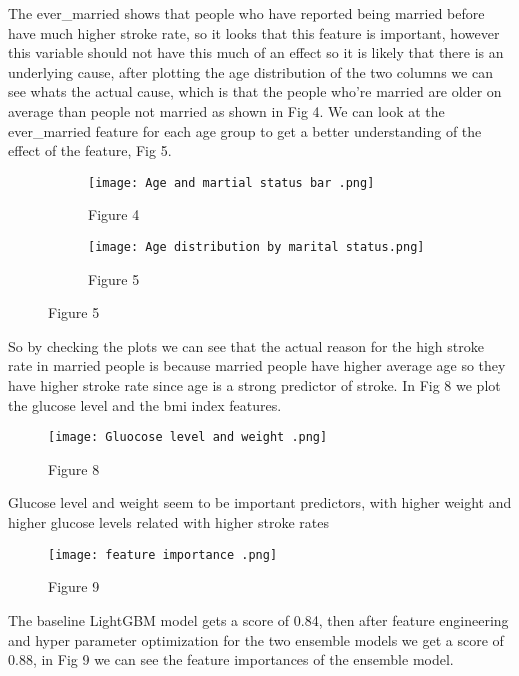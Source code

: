 \documentclass{article}
\begin{document}
 The ever\_married shows that people who have reported being married before have much higher stroke rate, so it looks that this feature is important, however this variable should not have this much of an effect so it is likely that there is an underlying cause, after plotting the age distribution of the two columns we can see whats the actual cause, which is that the people who're married are older on average than people not married as shown in Fig 4. We can look at the ever\_married feature for each age group to get a better understanding of the effect of the feature, Fig 5.

\begin{figure}[h]
     \centering
     \begin{subfigure}[b]{0.45\textwidth}
         \centering
         \texttt{[image: Age and martial status bar .png]}
            \captionsetup{labelformat=empty}
         \caption{Figure 4}
        
  
     \end{subfigure}
     \hfill
     \begin{subfigure}[hb]{0.4\textwidth}
         \centering
         \texttt{[image: Age distribution by marital status.png]}
            \captionsetup{labelformat=empty}
         \caption{Figure 5}
        
    
     \end{subfigure}
     \hfill

\end{figure}

So by checking the plots we can see that the actual reason for the high stroke rate in married people is because married people have higher average age so they have higher stroke rate since age is a strong predictor of stroke. 
 In Fig 8 we plot the glucose level and the bmi index features. 
\begin{figure}[h]
\centering
\texttt{[image: Gluocose level and weight .png]}
   \captionsetup{labelformat=empty}
\caption{Figure 8}

\end{figure}
Glucose level and weight seem to be important predictors, with higher weight and higher glucose levels related with higher stroke rates
\begin{figure}[h]
\texttt{[image: feature importance .png]}
\captionsetup{labelformat=empty}
\caption{Figure 9}
\end{figure}
The baseline LightGBM model gets a score of 0.84, then after feature engineering and hyper parameter optimization for the two ensemble models we get a score of 0.88, in Fig 9 we can see the feature importances of the ensemble model. 
\end{document}
